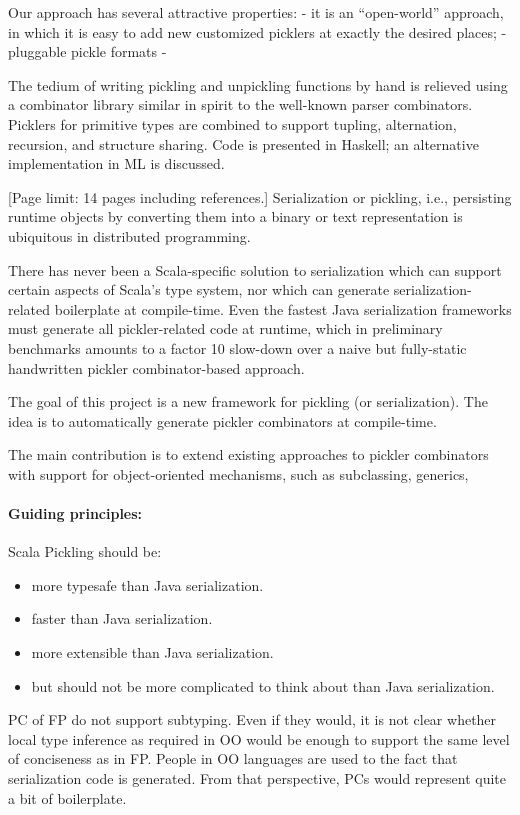 \documentclass[preprint,10pt]{sigplanconf}
\begin{document}
Our approach has several attractive properties:
- it is an ``open-world'' approach, in which it is easy to add new customized picklers at exactly the desired places;
- pluggable pickle formats
-

The tedium of writing pickling and unpickling functions by hand is relieved using a combinator library similar in spirit to the well-known parser combinators. Picklers for primitive
types are combined to support tupling, alternation, recursion, and structure sharing. Code
is presented in Haskell; an alternative implementation in ML is discussed.

[Page limit: 14 pages including references.]
Serialization or pickling, i.e., persisting runtime objects by
converting them into a binary or text representation is ubiquitous in
distributed programming.

There has never been a Scala-specific solution to serialization which
can support certain aspects of Scala's type system, nor which can
generate serialization-related boilerplate at compile-time. Even the
fastest Java serialization frameworks must generate all
pickler-related code at runtime, which in preliminary benchmarks
amounts to a factor 10 slow-down over a naive but fully-static handwritten pickler
combinator-based approach.

The goal of this project is a new framework for pickling (or
serialization). The idea is to automatically generate pickler
combinators at compile-time.

The main contribution is to extend existing approaches to
pickler combinators with support for object-oriented mechanisms, such
as subclassing, generics,

\paragraph{Guiding principles:}

Scala Pickling should be:
\begin{itemize}
  \item more typesafe than Java serialization.
  \item faster than Java serialization.
  \item more extensible than Java serialization.
  \item but should not be more complicated to think about than Java serialization.
\end{itemize}

PC of FP do not support subtyping. Even if they would, it is not clear whether local type inference as required in OO would be enough to support the same level of conciseness as in FP. People in OO languages are used to the fact that serialization code is generated. From that perspective, PCs would represent quite a bit of boilerplate.
\end{document}
